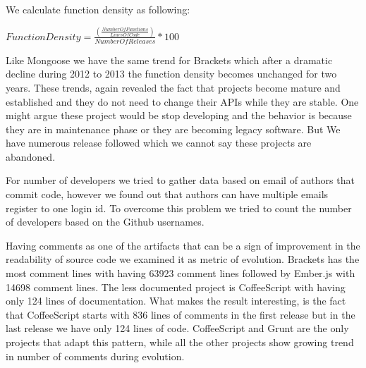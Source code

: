 \par
We calculate function density as following:

\begin{center}
	$Function Density=  \frac{\left ( \frac{Number Of Functions}{Lines Of Code} \right)}{Number Of Releases}\ast 100$
\end{center}

\par
Like Mongoose we have the same trend for Brackets which after a dramatic decline during 2012 to 2013 the function density becomes unchanged for two years. These trends, again revealed the fact that projects become mature and established and they do not need to change their APIs while they are stable. One might argue these project would be stop developing and the behavior is because they are in maintenance phase or they are becoming legacy software. But We have numerous release followed which we cannot say these projects are abandoned.  
 


\par For number of developers we tried to gather data based on email of authors that commit code, however we found out that authors can have multiple emails register to one login id. To overcome this problem we tried to count the number of developers based on the Github usernames. 


\par
Having comments as one of the artifacts that can be a sign of improvement in the readability of source code we examined it as metric of evolution.
Brackets has the most comment lines with having 63923 comment lines followed by Ember.js with 14698 comment lines. The less documented project is CoffeeScript with having only 124 lines of documentation. What makes the result interesting, is the fact that CoffeeScript starts with 836 lines of comments in the first release but in the last release we have only 124 lines of code. CoffeeScript and Grunt are the only projects that adapt this pattern, while all the other projects show growing trend in number of comments during evolution.  


